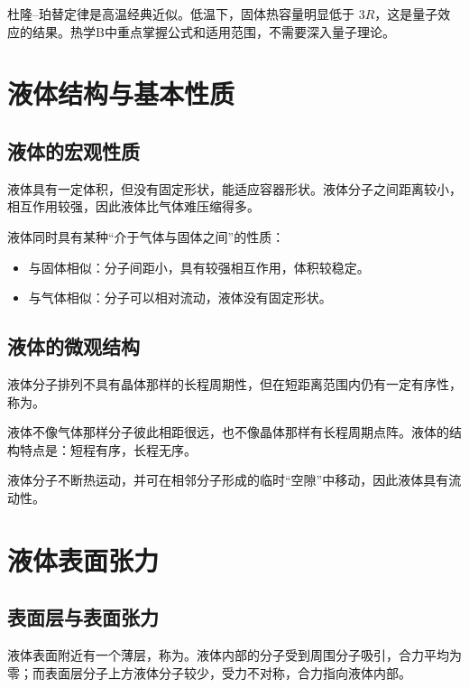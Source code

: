 \begin{WarnBox}[经典热容量的局限]
杜隆--珀替定律是高温经典近似。低温下，固体热容量明显低于 \(3R\)，这是量子效应的结果。热学B中重点掌握公式和适用范围，不需要深入量子理论。
\end{WarnBox}

\section{液体结构与基本性质}

\subsection{液体的宏观性质}

液体具有一定体积，但没有固定形状，能适应容器形状。液体分子之间距离较小，相互作用较强，因此液体比气体难压缩得多。

液体同时具有某种“介于气体与固体之间”的性质：
\begin{itemize}
  \item 与固体相似：分子间距小，具有较强相互作用，体积较稳定。
  \item 与气体相似：分子可以相对流动，液体没有固定形状。
\end{itemize}

\subsection{液体的微观结构}

液体分子排列不具有晶体那样的长程周期性，但在短距离范围内仍有一定有序性，称为。

\begin{KeyBox}[液体结构图像]
液体不像气体那样分子彼此相距很远，也不像晶体那样有长程周期点阵。液体的结构特点是：短程有序，长程无序。
\end{KeyBox}

液体分子不断热运动，并可在相邻分子形成的临时“空隙”中移动，因此液体具有流动性。

\section{液体表面张力}

\subsection{表面层与表面张力}

液体表面附近有一个薄层，称为。液体内部的分子受到周围分子吸引，合力平均为零；而表面层分子上方液体分子较少，受力不对称，合力指向液体内部。

